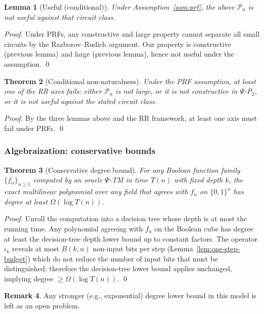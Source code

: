 \documentclass[11pt]{article}
\newtheorem{theorem}{Theorem}[section]
\newtheorem{lemma}[theorem]{Lemma}
\theoremstyle{plain}
\theoremstyle{definition}
\newtheorem{remark}[theorem]{Remark}
\newcommand{\PSi}{\Psi}
\newcommand{\bits}{\{0,1\}}
\begin{document}
\begin{lemma}[Useful (conditional)]
Under Assumption~\ref{asm:prf}, the above $\mathcal{P}_n$ is not useful against that circuit class.
\end{lemma}
\begin{proof}
Under PRFs, any constructive and large property cannot separate all small circuits by the Razborov--Rudich argument. Our property is constructive (previous lemma) and large (previous lemma), hence not useful under the assumption. \qed
\end{proof}

\begin{theorem}[Conditional non-naturalness]
Under the PRF assumption, at least one of the RR axes fails: either $\mathcal{P}_n$ is not large, or it is not constructive in $\PSi$-P$_2$, or it is not useful against the stated circuit class.
\end{theorem}
\begin{proof}
By the three lemmas above and the RR framework, at least one axis must fail under PRFs. \qed
\end{proof}

\subsubsection{Algebraization: conservative bounds}
\label{sec:algebraization}

\begin{theorem}[Conservative degree bound]
For any Boolean function family $\{f_n\}_{n\ge1}$ computed by an oracle $\PSi$-TM in time $T(n)$ with fixed depth $k$, the exact multilinear polynomial over any field that agrees with $f_n$ on $\bits^n$ has degree at least $\Omega(\log T(n))$.
\end{theorem}
\begin{proof}
Unroll the computation into a decision tree whose depth is at most the running time. Any polynomial agreeing with $f_n$ on the Boolean cube has degree at least the decision-tree depth lower bound up to constant factors. The operator $\iota_k$ reveals at most $B(k,n)$ non-input bits per step (Lemma~\ref{lem:one-step-budget}) which do not reduce the number of input bits that must be distinguished; therefore the decision-tree lower bound applies unchanged, implying degree $\ge \Omega(\log T(n))$. \qed
\end{proof}

\begin{remark}
Any stronger (e.g., exponential) degree lower bound in this model is left as an open problem.
\end{remark}
\end{document}
